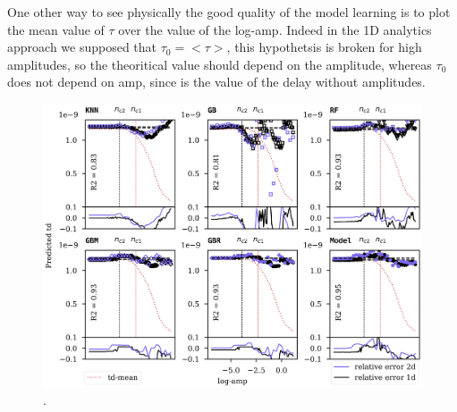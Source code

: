 \documentclass[11pt,a4paper]{report}
\begin{document}
\begin{multicols}{2}
    One other way to see physically the good quality of the model learning is to plot the mean value of $\tau$ over the value of the log-amp.
    Indeed in the 1D analytics approach we supposed that $\tau_0 = < \tau >$, this hypothetsis is broken for high amplitudes, so the theoritical value should depend on the amplitude, whereas $\tau_0$ does not depend on amp, since is the value of the delay without amplitudes.

\end{multicols}
\begin{figure}[H]
    \centering
    \includegraphics[width=1\linewidth]{./figures/delay_amp_final.png}
    \caption{.}
    \label{}
\end{figure}
\end{document}
